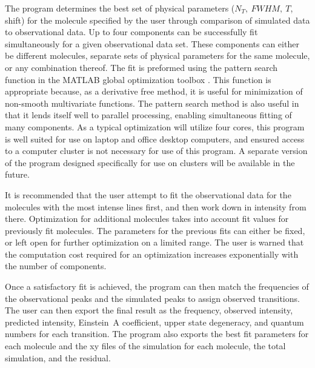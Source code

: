 \documentclass[11pt,twoside]{article}
\begin{document}
The program determines the best set of physical parameters ($N_T,~FWHM,~T$, shift) for the molecule specified by the user through comparison of simulated data to observational data.  Up to four components can be successfully fit simultaneously for a given observational data set.  These components can either be different molecules, separate sets of physical parameters for the same molecule, or any combination thereof.  The fit is preformed using the pattern search function in the MATLAB global optimization toolbox \citep{MATLAB}.  This function is appropriate because, as a derivative free method, it is useful for minimization of non-smooth multivariate functions.  The pattern search method is also useful in that it lends itself well to parallel processing, enabling simultaneous fitting of many components.  As a typical optimization will utilize four cores, this program is well suited for use on laptop and office desktop computers, and ensured access to a computer cluster is not necessary for use of this program.  A separate version of the program designed specifically for use on clusters will be available in the future.

It is recommended that the user attempt to fit the observational data for the molecules with the most intense lines first, and then work down in intensity from there.  Optimization for additional molecules takes into account fit values for previously fit molecules.  The parameters for the previous fits can either be fixed, or left open for further optimization on a limited range.  The user is warned that the computation cost required for an optimization increases exponentially with the number of components.

Once a satisfactory fit is achieved, the program can then match the frequencies of the observational peaks and the simulated peaks to assign observed transitions.  The user can then export the final result as the frequency, observed intensity, predicted intensity, Einstein~A coefficient, upper state degeneracy, and quantum numbers for each transition.  The program also exports the best fit parameters for each molecule and the xy files of the simulation for each molecule, the total simulation, and the residual.



\end{document}
